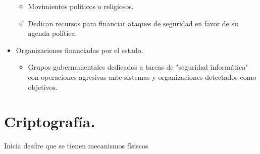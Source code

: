 \begin{itemize}
	\begin{itemize}
		\item Movimientos pol\'{i}ticos o religiosos.
		\item Dedican recursos para financiar ataques de seguridad en favor de su agenda pol\'{i}tica.
	\end{itemize}
	\item Organizaciones financiadas por el estado.
	\begin{itemize}
		\item Grupos gubernamentales dedicados a tareas de "seguridad inform\'{a}tica" con operaciones agresivas ante sistemas y organizaciones detectados como objetivos.
	\end{itemize}
\end{itemize}

\chapter{Criptograf\'{i}a.}

Inicia desdre que se tienen mecanismos f\'{i}siscos 

